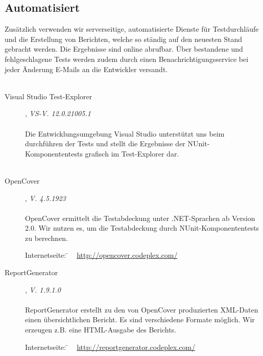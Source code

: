\subsection{Automatisiert}
\label{Abschnitt:Tests:Werkzeuge:Automatisiert}

Zusätzlich verwenden wir serverseitige, automatisierte Dienste für Testdurchläufe und die Erstellung von Berichten, welche so ständig auf den neuesten Stand gebracht werden. Die Ergebnisse sind online abrufbar. Über bestandene und fehlgeschlagene Tests werden zudem durch einen Benachrichtigungsservice bei jeder Änderung E-Mails an die Entwickler versandt.
\\
\\


\begin{description}

\item[Visual Studio Test-Explorer], \textit{VS-V. 12.0.21005.1}\hfill
	\\
	\\
	Die Entwicklungsumgebung Visual Studio unterstützt uns beim durchführen der Tests und stellt die Ergebnisse der NUnit-Komponententests grafisch im Test-Explorer dar.
	\\\\
	

\item[OpenCover], \textit{V. 4.5.1923}\hfill
	\\
	\\
	OpenCover ermittelt die Testabdeckung unter .NET-Sprachen ab Version 2.0. Wir nutzen es, um die Testabdeckung durch NUnit-Komponententests zu berechnen.
	
	\begin{tabbing}
		Internetseite:
		\= ~ \href {http://opencover.codeplex.com/}
	    	       {http://opencover.codeplex.com/} \\
	\end{tabbing}
	
	
	\item[ReportGenerator], \textit{V. 1.9.1.0}\hfill
	\\
	\\
	ReportGenerator erstellt zu den von OpenCover produzierten XML-Daten einen übersichtlichen Bericht. Es sind verschiedene Formate möglich. Wir erzeugen z.B. eine HTML-Ausgabe des Berichts.
	\begin{tabbing}
			Internetseite:
			\= ~ \href {http://reportgenerator.codeplex.com/}
		    	       {http://reportgenerator.codeplex.com/}
		    \\
	\end{tabbing}


\end{description}
